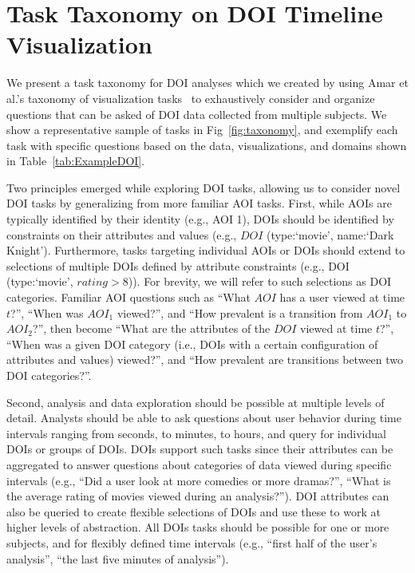 \section{Task Taxonomy on DOI Timeline Visualization}
\label{sec:Taxonomy}

We present a task taxonomy for DOI analyses which we created by using Amar et al.'s taxonomy of visualization tasks~\cite{amar2005low} to exhaustively consider and organize questions that can be asked of DOI data collected from multiple subjects. We show a representative sample of tasks in Fig~\ref{fig:taxonomy}, and exemplify each task with specific questions based on the data, visualizations, and domains shown in Table~\ref{tab:ExampleDOI}.

Two principles emerged while exploring DOI tasks, allowing us to consider novel DOI tasks by generalizing from more familiar AOI tasks. First, while AOIs are typically identified by their identity (e.g., AOI 1), DOIs should be identified by constraints on their attributes and values (e.g., $DOI$ (type:`movie', name:`Dark Knight'). Furthermore, tasks targeting individual AOIs or DOIs should extend to selections of multiple DOIs defined by attribute constraints (e.g., DOI (type:`movie', $rating>8$)). For brevity, we will refer to such selections as DOI categories. Familiar AOI questions such as ``What $AOI$ has a user viewed at time $t$?'', ``When was $AOI_1$ viewed?'', and ``How prevalent is a transition from $AOI_1$ to $AOI_2$?'', then become ``What are the attributes of the $DOI$ viewed at time $t$?'', ``When was a given DOI category (i.e., DOIs with a certain configuration of attributes and values) viewed?'', and ``How prevalent are transitions between two DOI categories?''.

Second, analysis and data exploration should be possible at multiple levels of detail. Analysts should be able to ask questions about user behavior during time intervals ranging from seconds, to minutes, to hours, and query for individual DOIs or groups of DOIs. DOIs support such tasks since their attributes can be aggregated to answer questions about categories of data viewed during specific intervals (e.g., ``Did a user look at more comedies or more dramas?'', ``What is the average rating of movies viewed during an analysis?''). DOI attributes can also be queried to create flexible selections of DOIs and use these to work at higher levels of abstraction. All DOIs tasks should be possible for one or more subjects, and for flexibly defined time intervals (e.g., ``first half of the user's analysis'', ``the last five minutes of analysis'').

